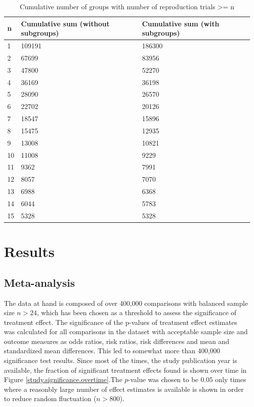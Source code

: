 \documentclass[11pt,a4paper,twoside]{book}\usepackage[]{graphicx}\usepackage[]{color}
\begin{document}
\begin{table}[ht]
\centering
\begingroup\footnotesize
\begin{tabular}{lll}
  \hline
n & Cumulative sum (without subgroups) & Cumulative sum (with subgroups) \\ 
  \hline
1 & 109191 & 186300 \\ 
  2 & 67699 & 83956 \\ 
  3 & 47800 & 52270 \\ 
  4 & 36169 & 36198 \\ 
  5 & 28090 & 26570 \\ 
  6 & 22702 & 20126 \\ 
  7 & 18547 & 15896 \\ 
  8 & 15475 & 12935 \\ 
  9 & 13008 & 10821 \\ 
  10 & 11008 & 9229 \\ 
  11 & 9362 & 7991 \\ 
  12 & 8057 & 7070 \\ 
  13 & 6988 & 6368 \\ 
  14 & 6044 & 5783 \\ 
  15 & 5328 & 5328 \\ 
   \hline
\end{tabular}
\endgroup
\caption{Cumulative number of groups with number of reproduction trials >= n} 
\label{repr.groups}
\end{table}

















\chapter{Results}




\section{Meta-analysis}
The data at hand is composed of over 400,000 comparisons with balanced sample size $n > 24$, which has been chosen as a threshold to assess the significance of treatment effect. The significance of the p-values of treatment effect estimates was calculated for all comparisons in the dataset with acceptable sample size and outcome measures as odds ratios, risk ratios, risk differences and mean and standardized mean differences. This led to somewhat more than 400,000 significance test results. Since most of the times, the study publication year is available, the fraction of significant treatment effects found is shown over time in Figure \ref{study.significance.overtime}.The $p$-value was chosen to be $0.05$  only times where a reasonbly large number of effect estimates is available is shown in order to reduce random fluctuation ($n > 800$). 
\end{document}
